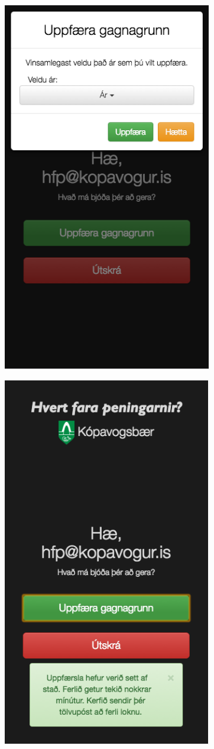 \documentclass{article}
\theoremstyle{blueP}
\theoremstyle{greenS}
\begin{document}
\begin{figure}[H]
\centering
\begin{minipage}{.5\textwidth}
  \centering
  \includegraphics[width=.6\linewidth]{./Admin_update.png}
  \label{fig:admin_update}
\end{minipage}%
\begin{minipage}{.5\textwidth}
  \centering
  \includegraphics[width=.6\linewidth]{./Admin_Update_started.png}
  \label{fig:admin_update_started}
\end{minipage}
\end{figure}
\end{document}
